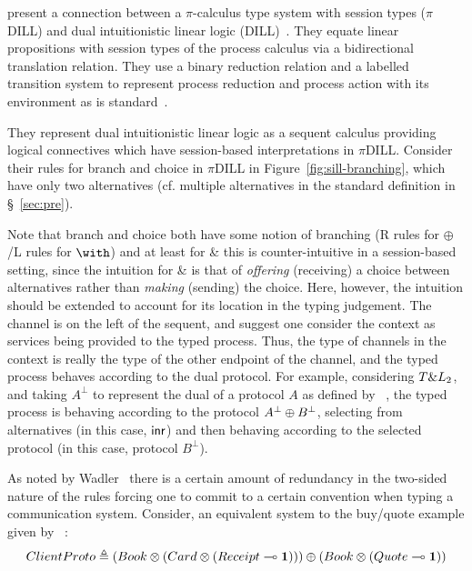 \documentclass{mpaper}
\begin{document}
\citeauthor{Caires:2010:STI} \cite{Caires:2010:STI} present a connection
between a $\pi$-calculus type system with session types ($\pi$DILL) and dual
intuitionistic linear logic (DILL)~\cite{Barber:1996}. They equate linear
propositions with session types of the process calculus via a bidirectional
translation relation. They use a binary reduction relation and a labelled
transition system to represent process reduction and process action with its
environment as is standard~\cite{Sangiorgi:2001}.



They represent dual intuitionistic linear logic as a sequent calculus
providing logical connectives which have session-based interpretations in
$\pi$DILL. Consider their rules for branch and choice in $\pi$DILL in
Figure~\ref{fig:sill-branching}, which have only two alternatives
(cf. multiple alternatives in the standard definition in \S~\ref{sec:pre}).

Note that branch and choice both have some notion of branching (R rules for
$\oplus$/L rules for $\with$) and at least for \& this is counter-intuitive in
a session-based setting, since the intuition for \& is that of
\emph{offering} (receiving) a choice between alternatives rather than
\emph{making} (sending) the choice. Here, however, the intuition should be
extended to account for its location in the typing judgement. The channel is
on the left of the sequent, and \citeauthor{Caires:2010:STI} suggest one
consider the context as services being provided to the typed process. Thus,
the type of channels in the context is really the type of the other endpoint
of the channel, and the typed process behaves according to the dual
protocol. For example, considering $T \& L_2$, and taking $A^\bot$ to
represent the dual of a protocol $A$ as defined by
\citeauthor{Wadler:2014}~\cite{Wadler:2014}, the typed process is behaving
according to the protocol ${A^\bot}\oplus{B^\bot}$, selecting from
alternatives (in this case, $\mathsf{inr}$) and then behaving according to the
selected protocol (in this case, protocol $B^\bot$).

As noted by Wadler~\cite{Wadler:2014} there is a certain amount of redundancy
in the two-sided nature of the rules forcing one to commit to a certain
convention when typing a communication system. Consider, an equivalent system
to the buy/quote example given by
\citeauthor{Caires:2010:STI}~\cite[\S~3]{Caires:2010:STI}:
\begin{gather*}
{ClientProto}\triangleq{{({Book}\otimes{({Card}\otimes{({Receipt}\multimap{\mathbf{1}})})})}\oplus{({Book}\otimes{({Quote}\multimap{\mathbf{1}})})}}
\end{gather*}
\end{document}
